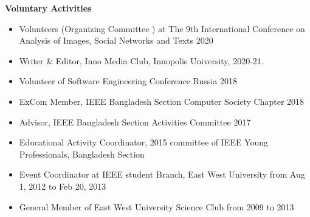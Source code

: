 \documentclass[letterpaper,10pt]{article}
\newcommand{\resheading}[1]{{\large \colorbox{mygrey}{\begin{minipage}{\textwidth}{\textbf{#1 \vphantom{p\^{E}}}}\end{minipage}}}}
\begin{document}
\resheading{Voluntary Activities}
\begin{itemize} 
\item Volunteers (Organizing Committee
) at The 9th International Conference on Analysis of Images, Social Networks and Texts 2020 

\item Writer \& Editor, Inno Media Club, Innopolis University, 2020-21.
	\item{Volunteer of Software Engineering Conference Russia 2018 }
	\item{ExCom Member, IEEE Bangladesh Section Computer Society Chapter 2018 }
	\item {Advisor, IEEE Bangladesh Section Activities Committee 2017}
\item {Educational Activity Coordinator, 2015 committee of IEEE Young Professionals, Bangladesh Section}
    \item{Event Coordinator at IEEE student Branch, East West University from Aug 1, 2012 to Feb 20, 2013 }
    \item {General Member of East West University Science Club from 2009 to 2013}
\end{itemize}






\end{document}
